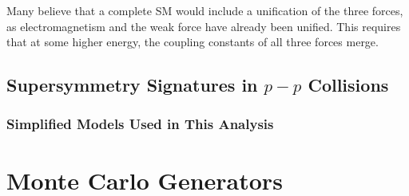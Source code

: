 Many believe that a complete \ac{SM} would include a unification of the three forces, as electromagnetism and the weak force have already been unified. This requires that at some higher energy, the coupling constants of all three forces merge. 

\subsection{Supersymmetry Signatures in $p-p$ Collisions}
\subsubsection{Simplified Models Used in This Analysis}
\label{sec:simplified_models}

\section{Monte Carlo Generators}
\label{sec:MC_gen}